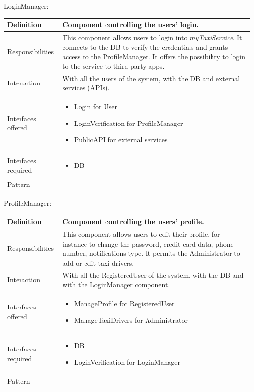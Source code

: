 \documentclass[a4paper,11pt]{report} %
\newcommand{\mts}{\mbox{\normalfont\itshape myTaxiService}}
\begin{document}
	\pagebreak
	\centerline{LoginManager:}	
	\begin{center}
		\begin{tabular}{| l | p{9cm} |}\hline
			Definition & Component controlling the users' login.\\\hline
			Responsibilities & This component allows users to login into \mts{}. It connects to the DB to verify the credentials and grants access to the ProfileManager. It offers the possibility to login to the service to third party apps.\\\hline
			Interaction & With all the users of the system, with the DB and external services (APIs).\\\hline
			Interfaces offered & \begin{itemize}
				\item Login for User
				\item LoginVerification for ProfileManager
				\item PublicAPI for external services
			\end{itemize}\\\hline
			Interfaces required & \begin{itemize}
				\item DB 
			\end{itemize}\\\hline
			Pattern & \\\hline
		\end{tabular}
	\end{center}
	\bigskip
	\bigskip
	\centerline{ProfileManager:}
	\begin{center}
		\begin{tabular}{| l | p{9cm} |}\hline
			Definition & Component controlling the users' profile.\\\hline
			Responsibilities & This component allows users to edit their profile, for instance to change the password, credit card data, phone number, notifications type. It permits the Administrator to add or edit taxi drivers.\\\hline
			Interaction & With all the RegisteredUser of the system, with the DB and with the LoginManager component.\\\hline
			Interfaces offered & \begin{itemize}
				\item ManageProfile for RegisteredUser
				\item ManageTaxiDrivers for Administrator
			\end{itemize}\\\hline
			Interfaces required & \begin{itemize}
				\item DB
				\item LoginVerification for LoginManager
			\end{itemize}\\\hline
			Pattern & \\\hline
		\end{tabular}
	\end{center}
	
\end{document}
